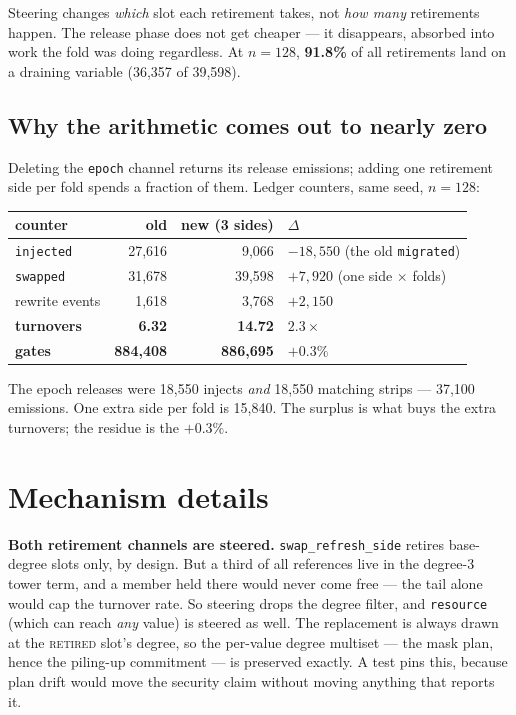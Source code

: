 \documentclass[11pt]{article}
\begin{document}
Steering changes \emph{which} slot each retirement takes, not \emph{how many}
retirements happen. The release phase does not get cheaper --- it disappears,
absorbed into work the fold was doing regardless. At $n=128$, \textbf{91.8\%}
of all retirements land on a draining variable (36{,}357 of 39{,}598).

\subsection*{Why the arithmetic comes out to nearly zero}

Deleting the \texttt{epoch} channel returns its release emissions; adding one
retirement side per fold spends a fraction of them. Ledger counters, same seed,
$n=128$:

\begin{center}
\begin{tabular}{lrrl}
\toprule
counter & old & new (3 sides) & $\Delta$ \\
\midrule
\texttt{injected} & 27{,}616 & 9{,}066 & $-18{,}550$ (the old \texttt{migrated}) \\
\texttt{swapped} & 31{,}678 & 39{,}598 & $+7{,}920$ (one side $\times$ folds) \\
rewrite events & 1{,}618 & 3{,}768 & $+2{,}150$ \\
\midrule
\textbf{turnovers} & \textbf{6.32} & \textbf{14.72} & $\mathbf{2.3\times}$ \\
\textbf{gates} & \textbf{884{,}408} & \textbf{886{,}695} & $\mathbf{+0.3\%}$ \\
\bottomrule
\end{tabular}
\end{center}

\noindent The epoch releases were 18{,}550 injects \emph{and} 18{,}550 matching
strips --- 37{,}100 emissions. One extra side per fold is 15{,}840. The surplus
is what buys the extra turnovers; the residue is the $+0.3\%$.

\section{Mechanism details}

\textbf{Both retirement channels are steered.} \texttt{swap\_refresh\_side}
retires base-degree slots only, by design. But a third of all references live
in the degree-3 tower term, and a member held there would never come free ---
the tail alone would cap the turnover rate. So steering drops the degree
filter, and \texttt{resource} (which can reach \emph{any} value) is steered as
well. The replacement is always drawn at the \textsc{retired} slot's degree, so
the per-value degree multiset --- the mask plan, hence the piling-up commitment
--- is preserved exactly. A test pins this, because plan drift would move the
security claim without moving anything that reports it.
\end{document}
